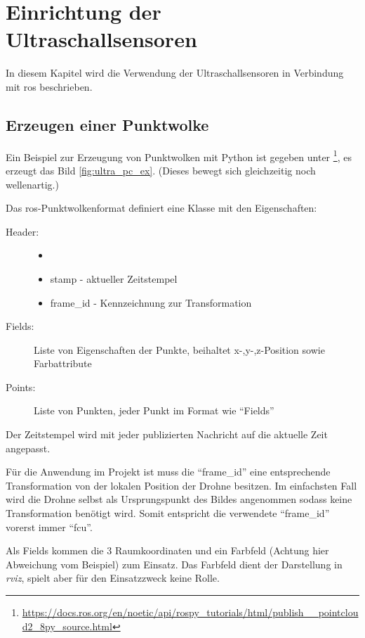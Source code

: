 \section{Einrichtung der Ultraschallsensoren}
In diesem Kapitel wird die Verwendung der Ultraschallsensoren in Verbindung mit \acrshort{ros} beschrieben.

\subsection{Erzeugen einer Punktwolke}
Ein Beispiel zur Erzeugung von Punktwolken mit Python ist gegeben unter \footnote{\url{https://docs.ros.org/en/noetic/api/rospy_tutorials/html/publish__pointcloud2_8py_source.html}}, es erzeugt das Bild \ref{fig:ultra_pc_ex}. (Dieses bewegt sich gleichzeitig noch wellenartig.)

Das \acrshort{ros}-Punktwolkenformat definiert eine Klasse mit den Eigenschaften:
\begin{description}
    \item[Header:]
    \begin{itemize}
        \item[]
        \item stamp - aktueller Zeitstempel
        \item frame\_id - Kennzeichnung zur Transformation
    \end{itemize}
    \item[Fields:] Liste von Eigenschaften der Punkte, beihaltet x-,y-,z-Position sowie Farbattribute
    \item[Points:] Liste von Punkten, jeder Punkt im Format wie \enquote{Fields}
\end{description}

Der Zeitstempel wird mit jeder publizierten Nachricht auf die aktuelle Zeit angepasst.

Für die Anwendung im Projekt ist muss die \enquote{frame\_id} eine entsprechende Transformation von der lokalen Position der Drohne besitzen. Im einfachsten Fall wird die Drohne selbst als Ursprungspunkt des Bildes angenommen sodass keine Transformation benötigt wird. Somit entspricht die verwendete \enquote{frame\_id} vorerst immer \enquote{fcu}.

Als Fields kommen die 3 Raumkoordinaten und ein Farbfeld (Achtung hier Abweichung vom Beispiel) zum Einsatz. Das Farbfeld dient der Darstellung in \textit{rviz}, spielt aber für den Einsatzzweck keine Rolle.\\

